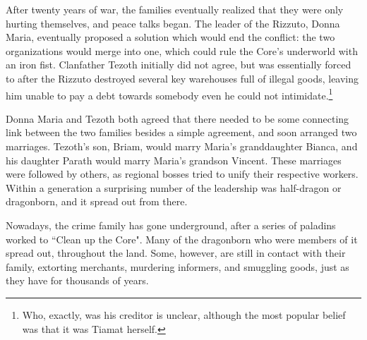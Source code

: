 After twenty years of war, the families eventually realized that they were only hurting themselves, and peace talks began.
The leader of the Rizzuto, Donna Maria, eventually proposed a solution which would end the conflict: the two organizations would merge into one, which could rule the Core's underworld with an iron fist.
Clanfather Tezoth initially did not agree, but was essentially forced to after the Rizzuto destroyed several key warehouses full of illegal goods, leaving him unable to pay a debt towards somebody even he could not intimidate.\footnote{Who, exactly, was his creditor is unclear, although the most popular belief was that it was Tiamat herself.}

Donna Maria and Tezoth both agreed that there needed to be some connecting link between the two families besides a simple agreement, and soon arranged two marriages.
Tezoth's son, Briam, would marry Maria's granddaughter Bianca, and his daughter Parath would marry Maria's grandson Vincent.
These marriages were followed by others, as regional bosses tried to unify their respective workers.
Within a generation a surprising number of the leadership was half-dragon or dragonborn, and it spread out from there.

Nowadays, the crime family has gone underground, after a series of paladins worked to ``Clean up the Core".
Many of the dragonborn who were members of it spread out, throughout the land.
Some, however, are still in contact with their family, extorting merchants, murdering informers, and smuggling goods, just as they have for thousands of years.


